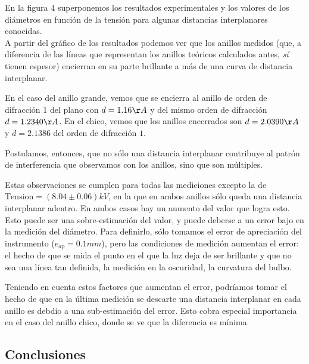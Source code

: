 \documentclass[]{article}
\begin{document}
En la figura 4 superponemos los resultados experimentales y los valores
de los diámetros en función de la tensión para algunas distancias
interplanares conocidas.\\
A partir del gráfico de los resultados podemos ver que los anillos
medidos (que, a diferencia de las líneas que representan los anillos
teóricos calculados antes, \emph{sí} tienen espesor) encierran en su
parte brillante a más de una curva de distancia interplanar.

En el caso del anillo grande, vemos que se encierra al anillo de orden
de difracción \(1\) del plano con \(d = 1.16\AA\) y del mismo orden de
difracción \(d = 1.2340\AA\). En el chico, vemos que los anillos
encerrados son \(d = 2.0390\AA\) y \(d = 2.1386\) del orden de
difracción \(1\).

Postulamos, entonces, que no sólo una distancia interplanar contribuye
al patrón de interferencia que observamos con los anillos, sino que son
múltiples.

Estas observaciones se cumplen para todas las mediciones excepto la de
\(\mathrm{Tension} = (8.04 \pm 0.06)kV\), en la que en ambos anillos
sólo queda una distancia interplanar adentro. En ambos casos hay un
aumento del valor que logra esto. Esto puede ser una sobre-estimación
del valor, y puede deberse a un error bajo en la medición del diámetro.
Para definirlo, sólo tomamos el error de apreciación del instrumento
(\(e_{ap} = 0.1mm\)), pero las condiciones de medición aumentan el
error: el hecho de que se mida el punto en el que la luz deja de ser
brillante y que no sea una línea tan definida, la medición en la
oscuridad, la curvatura del bulbo.

Teniendo en cuenta estos factores que aumentan el error, podríamos tomar
el hecho de que en la última medición se descarte una distancia
interplanar en cada anillo es debdio a una sub-estimación del error.
Esto cobra especial importancia en el caso del anillo chico, donde se ve
que la diferencia es mínima.

\hypertarget{conclusiones}{%
\subsection{Conclusiones}\label{conclusiones}}
\end{document}
